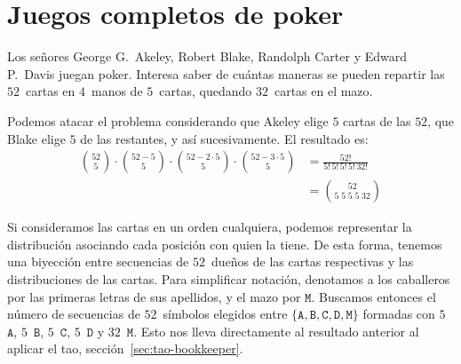 %

\section{Juegos completos de poker}
\label{sec:poker-juegos}

  Los señores George G.~Akeley,
  Robert Blake,
  Randolph Carter
  y Edward P.~Davis
  juegan poker.
  Interesa saber
  de cuántas maneras se pueden repartir las \(52\)~cartas
  en \(4\)~manos de \(5\)~cartas,
  quedando \(32\)~cartas en el mazo.

  Podemos atacar el problema considerando que Akeley
  elige \(5\) cartas de las \(52\),
  que Blake elige \(5\) de las restantes,
  y así sucesivamente.
  El resultado es:
  \begin{align*}
    \binom{52}{5}
	\cdot \binom{52 - 5}{5}
	\cdot \binom{52 - 2 \cdot 5}{5}
	\cdot \binom{52 - 3 \cdot 5}{5}
      &= \frac{52!}{5! \, 5! \, 5! \, 5! \, 32!} \\
      &= \binom{52}{5 \; 5 \; 5 \; 5 \; 32}
  \end{align*}

  Si consideramos las cartas en un orden cualquiera,
  podemos representar la distribución
  asociando cada posición con quien la tiene.
  De esta forma,
  tenemos una biyección
  entre secuencias de \(52\)~dueños de las cartas respectivas
  y las distribuciones de las cartas.
  Para simplificar notación,
  denotamos a los caballeros
  por las primeras letras de sus apellidos,
  y el mazo por \(\mathtt{M}\).
  Buscamos entonces el número de secuencias de \(52\)~símbolos
  elegidos
  entre
    \(\{\mathtt{A}, \mathtt{B}, \mathtt{C}, \mathtt{D},
	\mathtt{M}\}\)
  formadas con \(5\)~\(\mathtt{A}\),
  \(5\)~\(\mathtt{B}\),
  \(5\)~\(\mathtt{C}\),
  \(5\)~\(\mathtt{D}\) y \(32\)~\(\mathtt{M}\).
  Esto nos lleva directamente al resultado anterior
  al aplicar el tao,
  sección~\ref{sec:tao-bookkeeper}.%

